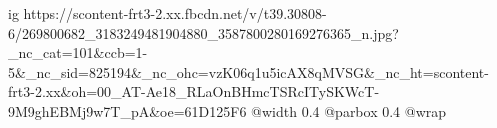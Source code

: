  
 
 
 
 

\ifcmt
  ig https://scontent-frt3-2.xx.fbcdn.net/v/t39.30808-6/269800682_3183249481904880_3587800280169276365_n.jpg?_nc_cat=101&ccb=1-5&_nc_sid=825194&_nc_ohc=vzK06q1u5icAX8qMVSG&_nc_ht=scontent-frt3-2.xx&oh=00_AT-Ae18_RLaOnBHmcTSRcITySKWcT-9M9ghEBMj9w7T_pA&oe=61D125F6
  @width 0.4
  @parbox 0.4
  @wrap \parpic[r]
\fi
